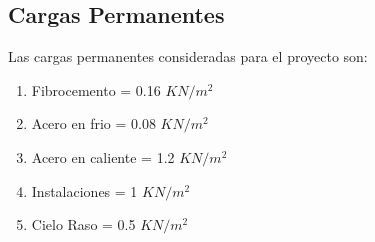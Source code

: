 \documentclass{article}
\begin{document}

\subsection{Cargas Permanentes}
Las cargas permanentes consideradas para el proyecto son:
\begin{enumerate}
    \item[\textbullet] Fibrocemento = 0.16 $KN/m^2$
    \item[\textbullet] Acero en frio = 0.08 $KN/m^2$
    \item[\textbullet] Acero en caliente = 1.2 $KN/m^2$
    \item[\textbullet] Instalaciones = 1 $KN/m^2$
    \item[\textbullet] Cielo Raso = 0.5 $KN/m^2$
    
\end{enumerate}
\end{document}
